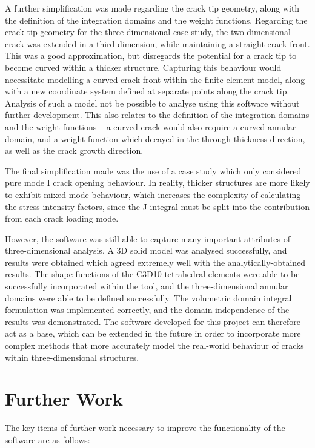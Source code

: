 A further simplification was made regarding the crack tip geometry, along with the definition of the integration domains and the weight functions. Regarding the crack-tip geometry for the three-dimensional case study, the two-dimensional crack was extended in a third dimension, while maintaining a straight crack front. This was a good approximation, but disregards the potential for a crack tip to become curved within a thicker structure. Capturing this behaviour would necessitate modelling a curved crack front within the finite element model, along with a new coordinate system defined at separate points along the crack tip. Analysis of such a model not be possible to analyse using this software without further development. This also relates to the definition of the integration domains and the weight functions -- a curved crack would also require a curved annular domain, and a weight function which decayed in the through-thickness direction, as well as the crack growth direction.

The final simplification made was the use of a case study which only considered pure mode I crack opening behaviour. In reality, thicker structures are more likely to exhibit mixed-mode behaviour, which increases the complexity of calculating the stress intensity factors, since the J-integral must be split into the contribution from each crack loading mode.

However, the software was still able to capture many important attributes of three-dimensional analysis. A 3D solid model was analysed successfully, and results were obtained which agreed extremely well with the analytically-obtained results. The shape functions of the C3D10 tetrahedral elements were able to be successfully incorporated within the tool, and the three-dimensional annular domains were able to be defined successfully. The volumetric domain integral formulation was implemented correctly, and the domain-independence of the results was demonstrated. The software developed for this project can therefore act as a base, which can be extended in the future in order to incorporate more complex methods that more accurately model the real-world behaviour of cracks within three-dimensional structures.

\section{Further Work}

The key items of further work necessary to improve the functionality of the software are as follows:

